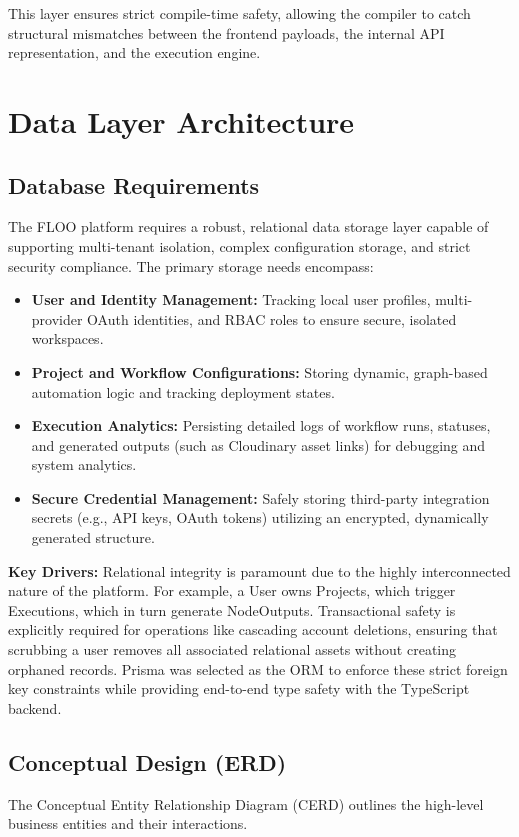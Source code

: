 This layer ensures strict compile-time safety, allowing the compiler to catch structural mismatches between the frontend payloads, the internal API representation, and the execution engine.





\section{Data Layer Architecture}

\subsection{Database Requirements}
The FLOO platform requires a robust, relational data storage layer capable of supporting multi-tenant isolation, complex configuration storage, and strict security compliance. The primary storage needs encompass:
\begin{itemize}
    \item \textbf{User and Identity Management:} Tracking local user profiles, multi-provider OAuth identities, and RBAC roles to ensure secure, isolated workspaces.
    \item \textbf{Project and Workflow Configurations:} Storing dynamic, graph-based automation logic and tracking deployment states.
    \item \textbf{Execution Analytics:} Persisting detailed logs of workflow runs, statuses, and generated outputs (such as Cloudinary asset links) for debugging and system analytics.
    \item \textbf{Secure Credential Management:} Safely storing third-party integration secrets (e.g., API keys, OAuth tokens) utilizing an encrypted, dynamically generated structure.
\end{itemize}

\textbf{Key Drivers:} Relational integrity is paramount due to the highly interconnected nature of the platform. For example, a User owns Projects, which trigger Executions, which in turn generate NodeOutputs. Transactional safety is explicitly required for operations like cascading account deletions, ensuring that scrubbing a user removes all associated relational assets without creating orphaned records. Prisma was selected as the ORM to enforce these strict foreign key constraints while providing end-to-end type safety with the TypeScript backend.

\subsection{Conceptual Design (ERD)}
The Conceptual Entity Relationship Diagram (CERD) outlines the high-level business entities and their interactions.

